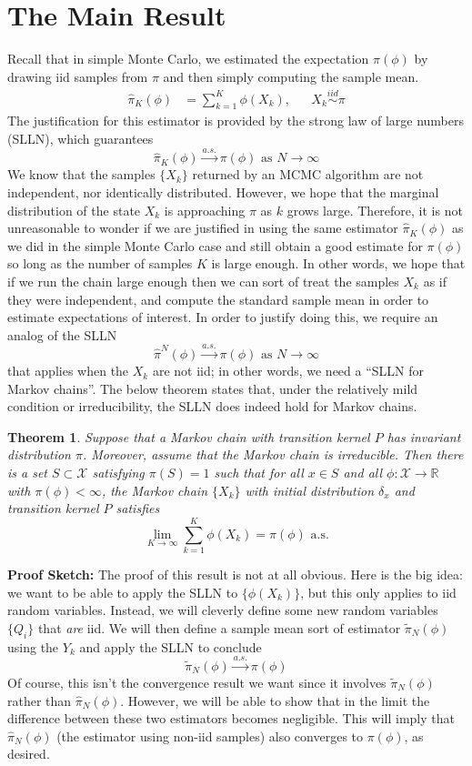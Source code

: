 \documentclass[12pt]{article}
\newcommand{\R}{\mathbb{R}}
\newtheorem{thm}{Theorem}
\begin{document}
\section{The Main Result}
Recall that in simple Monte Carlo, we estimated the expectation $\pi(\phi)$ by drawing iid samples from $\pi$ and then simply computing the sample mean. 
\begin{align*}
\hat{\pi}_K(\phi) &= \sum_{k = 1}^{K} \phi(X_k), && X_k \overset{iid}{\sim} \pi
\end{align*}
The justification for this estimator is provided by the strong law of large numbers (SLLN), which guarantees 
\[\hat{\pi}_K(\phi) \overset{a.s.}{\to} \pi(\phi) \text{ as } N \to \infty\]
We know that the samples $\{X_k\}$ returned by an MCMC algorithm are not independent, nor identically distributed. However, we hope that the marginal distribution of 
the state $X_k$ is approaching $\pi$ as $k$ grows large. Therefore, it is not unreasonable to wonder if we are justified in using the same estimator $\hat{\pi}_K(\phi)$ as we 
did in the simple Monte Carlo case and still obtain a good estimate for $\pi(\phi)$ so long as the number of samples $K$ is large enough. In other words, we hope that if we 
run the chain large enough then we can sort of treat the samples $X_k$ as if they were independent, and compute the standard sample mean in order to estimate expectations
of interest. In order to justify doing this, we require an analog of the SLLN 
\[\hat{\pi}^N(\phi) \overset{a.s.}{\to} \pi(\phi) \text{ as } N \to \infty\]
that applies when the $X_k$ are not iid; in other words, we need a ``SLLN for Markov chains''. The below theorem states that, under the relatively mild condition or irreducibility, the 
SLLN does indeed hold for Markov chains. 
\begin{thm} 
Suppose that a Markov chain with transition kernel $P$ has invariant distribution $\pi$. Moreover, assume that the Markov chain is irreducible. Then there is a set $S \subset \mathcal{X}$ 
satisfying $\pi(S) = 1$ such that for all $x \in S$ and all $\phi: \mathcal{X} \to \R$ with $\pi(\phi) < \infty$, the Markov chain $\{X_k\}$ with initial distribution $\delta_x$ and transition kernel $P$ 
satisfies
\[\lim_{K \to \infty} \sum_{k = 1}^{K} \phi(X_k) = \pi(\phi) \text{ a.s.} \]
\end{thm}

\bigskip
\noindent
\textbf{Proof Sketch:} The proof of this result is not at all obvious. Here is the big idea: we want to be able to apply the SLLN to $\{\phi(X_k)\}$, but this only applies to iid random variables. Instead, we will 
cleverly define some new random variables $\{Q_i\}$ that \textit{are} iid. We will then define a sample mean sort of estimator $\tilde{\pi}_N(\phi)$ using the $Y_k$ and apply the SLLN to conclude 
\[\tilde{\pi}_N(\phi) \overset{a.s.}{\to} \pi(\phi)\]
Of course, this isn't the convergence result we want since it involves $\tilde{\pi}_N(\phi)$ rather than $\hat{\pi}_N(\phi)$. However, we will be able to show that in the limit the difference between 
these two estimators becomes negligible. This will imply that $\hat{\pi}_N(\phi)$ (the estimator using non-iid samples) also converges to $\pi(\phi)$, as desired. 
\end{document}
